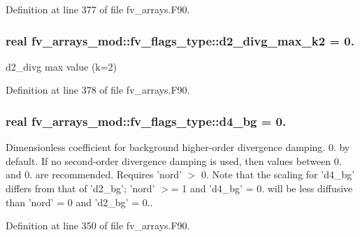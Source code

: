 Definition at line 377 of file fv\-\_\-arrays.\-F90.

\subsubsection[{d2\-\_\-divg\-\_\-max\-\_\-k2}]{\setlength{\rightskip}{0pt plus 5cm}real fv\-\_\-arrays\-\_\-mod\-::fv\-\_\-flags\-\_\-type\-::d2\-\_\-divg\-\_\-max\-\_\-k2 = 0.}\label{structfv__arrays__mod_1_1fv__flags__type_a69f302ae25d38e4087c57150f2e2aa30}


d2\-\_\-divg max value (k=2) 



Definition at line 378 of file fv\-\_\-arrays.\-F90.

\subsubsection[{d4\-\_\-bg}]{\setlength{\rightskip}{0pt plus 5cm}real fv\-\_\-arrays\-\_\-mod\-::fv\-\_\-flags\-\_\-type\-::d4\-\_\-bg = 0.}\label{structfv__arrays__mod_1_1fv__flags__type_a400c02695fa4bfa1d2e4aaf21059638a}


Dimensionless coefficient for background higher-\/order divergence damping. 0. by default. If no second-\/order divergence damping is used, then values between 0. and 0. are recommended. Requires 'nord' $>$ 0. Note that the scaling for 'd4\-\_\-bg' differs from that of 'd2\-\_\-bg'; 'nord' $>$= 1 and 'd4\-\_\-bg' = 0. will be less diffusive than 'nord' = 0 and 'd2\-\_\-bg' = 0.. 



Definition at line 350 of file fv\-\_\-arrays.\-F90.

